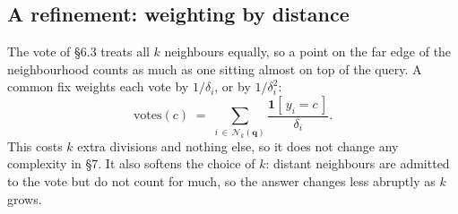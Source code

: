 \documentclass[11pt]{article}
\theoremstyle{plain}
\theoremstyle{definition}
\theoremstyle{remark}
\newcommand{\vc}[1]{\mathbf{#1}}
\newcommand{\Nk}{\mathcal{N}_k}
\begin{document}
\subsection{A refinement: weighting by distance}
The vote of \S6.3 treats all $k$ neighbours equally, so a point on the far edge
of the neighbourhood counts as much as one sitting almost on top of the query.
A common fix weights each vote by $1/\delta_i$, or by $1/\delta_i^{2}$:
\[
  \mathrm{votes}(c)
  \;=\; \sum_{i\,\in\,\Nk(\vc{q})}
        \frac{\mathbf{1}[\,y_i=c\,]}{\delta_i} .
\]
This costs $k$ extra divisions and nothing else, so it does not change any
complexity in \S7. It also softens the choice of $k$: distant neighbours are
admitted to the vote but do not count for much, so the answer changes less
abruptly as $k$ grows.

\end{document}
